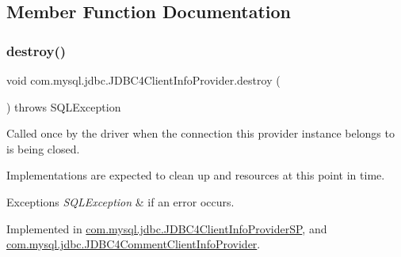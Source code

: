 \subsection{Member Function Documentation}
\mbox{\label{interfacecom_1_1mysql_1_1jdbc_1_1_j_d_b_c4_client_info_provider_affe0c92bcc9885faf204401f221fed76}} 
\subsubsection{\texorpdfstring{destroy()}{destroy()}}
{\footnotesize\ttfamily void com.\+mysql.\+jdbc.\+J\+D\+B\+C4\+Client\+Info\+Provider.\+destroy (\begin{DoxyParamCaption}{ }\end{DoxyParamCaption}) throws S\+Q\+L\+Exception}

Called once by the driver when the connection this provider instance belongs to is being closed.

Implementations are expected to clean up and resources at this point in time.


\begin{DoxyExceptions}{Exceptions}
{\em S\+Q\+L\+Exception} & if an error occurs. \\
\hline
\end{DoxyExceptions}


Implemented in \mbox{\hyperlink{classcom_1_1mysql_1_1jdbc_1_1_j_d_b_c4_client_info_provider_s_p_a0115e7120ff51f36e85b8d4bfb10c3f7}{com.\+mysql.\+jdbc.\+J\+D\+B\+C4\+Client\+Info\+Provider\+SP}}, and \mbox{\hyperlink{classcom_1_1mysql_1_1jdbc_1_1_j_d_b_c4_comment_client_info_provider_afd0b86441f8ca2b65dae7c265b69ecec}{com.\+mysql.\+jdbc.\+J\+D\+B\+C4\+Comment\+Client\+Info\+Provider}}.

\mbox{\label{interfacecom_1_1mysql_1_1jdbc_1_1_j_d_b_c4_client_info_provider_a7e0893a815f6b668deec04d40d60e985}} 
